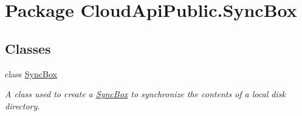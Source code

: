 \hypertarget{namespace_cloud_api_public_1_1_sync_box}{\section{Package Cloud\-Api\-Public.\-Sync\-Box}
\label{namespace_cloud_api_public_1_1_sync_box}
}
\subsection*{Classes}
\begin{DoxyCompactItemize}
\item 
class \hyperlink{class_cloud_api_public_1_1_sync_box_1_1_sync_box}{Sync\-Box}
\begin{DoxyCompactList}\small\item\em A class used to create a \hyperlink{class_cloud_api_public_1_1_sync_box_1_1_sync_box}{Sync\-Box} to synchronize the contents of a local disk directory. \end{DoxyCompactList}\end{DoxyCompactItemize}
